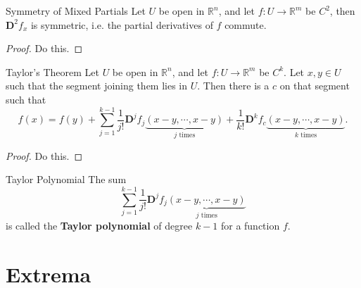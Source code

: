 \documentclass[10pt]{report}
\begin{document}
\begin{thrm}{Symmetry of Mixed Partials}{}
	Let $U$ be open in $\mathbb{R}^n$, and let $f:U \to \mathbb{R}^m$ be $C^2$, then $\mathbf{D}^2f_x$ is symmetric, i.e. the partial derivatives of $f$ commute.
\end{thrm}
\begin{proof}
	{\color{red}Do this.}
\end{proof}

\begin{thrm}{Taylor's Theorem}{}
Let $U$ be open in $\mathbb{R}^n$, and let $f: U \to \mathbb{R}^m$ be $C^k$. Let $x,y \in U$ such that the segment joining them lies in $U$. Then there is a $c$ on that segment such that
\[
	f(x) = f(y) + \sum_{j=1}^{k-1} \frac{1}{j!} \mathbf{D}^j f_j \underbrace{(x-y, \cdots, x-y)}_{j \text{ times}} + \frac{1}{k!} \mathbf{D}^k f_c \underbrace{(x-y, \cdots, x-y)}_{k \text{ times}}.
\] 
\end{thrm}
\begin{proof}
	{\color{red}Do this.}
\end{proof}

\begin{defn}{Taylor Polynomial}{}
The sum
\[
\sum_{j=1}^{k-1} \frac{1}{j!} \mathbf{D}^j f_j \underbrace{(x-y, \cdots, x-y)}_{j \text{ times}}
\] is called the \textbf{Taylor polynomial} of degree $k-1$ for a function $f$.
\end{defn}


\section{Extrema}
\end{document}
